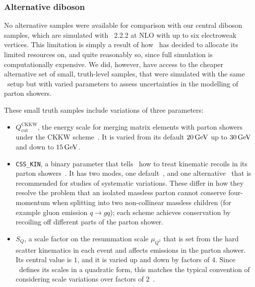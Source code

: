 \subsubsection{Alternative diboson}
\label{sec:2ljets_diboson_alt}
No alternative samples were available for comparison with our central diboson
samples, which are simulated with \sherpa~2.2.2 at NLO with up to six
electroweak vertices.
This limitation is simply a result of how \atlas\ has decided to allocate
its limited resources on, and quite reasonably so, since full simulation is
computationally expensive.
We did, however, have access to the cheaper alternative set of small,
truth-level samples, that were simulated with the same \sherpa\ setup but with
varied parameters to assess uncertainties in the modelling of parton showers.

These small truth samples include variations of three parameters:
\begin{itemize}
\item $Q_\textrm{cut}^\textrm{CKKW}$, the energy scale for merging
matrix elements with parton showers under the CKKW
scheme~\cite{Catani_2001_CKKW,Hoeche:2009rj}.
It is varied from its default $20\,\eV[G]$ up to $30\,\eV[G]$ and down
to $15\,\eV[G]$.
\item \texttt{CSS\_KIN}, a binary parameter that tells \sherpa\ how to treat
kinematic recoils in its parton showers~\cite{sherpa_222_manual}.
It has two modes, one default~\cite{Hoeche:2009rj}, and one
alternative~\cite{Hoeche:2009xc}
that is recommended for studies of systematic variations.
These differ in how they resolve the problem that an isolated massless parton
cannot conserve four-momentum when splitting into two non-collinear massless
children (for example gluon emission $q\rightarrow gq$);
each scheme achieves conservation by recoiling off different parts of the
parton shower.
\item $S_Q$, a scale factor on the resummation scale $\mu_{Q^2}$ that is set
from the hard scatter kinematics in each event and affects emissions in the
parton shower.
Its central value is $1$, and it is varied up and down by factors of $4$.
Since \sherpa\ defines its scales in a quadratic form, this matches the typical
convention of considering scale variations over factors of
$2$~\cite{sherpa_222_manual,Bothmann:2019yzt}.
\end{itemize}

